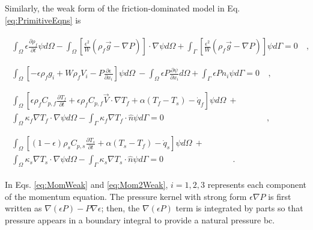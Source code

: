 \noindent Similarly, the weak form of the friction-dominated model in Eq. \eqref{eq:PrimitiveEqns} is

\begin{subequations}
\label{eq:PrimitiveWeakForms}
\begin{align}
\label{eq:Mass2Weak}
\begin{split}
\int_\Omega\epsilon\frac{\partial\rho_f}{\partial t}\psi d\Omega-\int_\Omega\left\lbrack\frac{\epsilon^2}{W}\left(\rho_f\vec{g}-\nabla P\right)\right\rbrack\cdot\nabla\psi d\Omega+\int_\Gamma\left\lbrack\frac{\epsilon^2}{W}\left(\rho_f\vec{g}-\nabla P\right)\right\rbrack \psi d\Gamma=0&\ ,\\
&
\end{split}\\
%
%
\label{eq:Mom2Weak}
\begin{split}\int_\Omega\left\lbrack-\epsilon\rho_f g_i+W\rho_fV_i-P\frac{\partial\epsilon}{\partial x_i}\right\rbrack\psi d\Omega\ -\int_\Omega \epsilon P\frac{\partial\psi}{\partial x_i}d\Omega+\int_\Gamma\epsilon Pn_i\psi d\Gamma=0&\ ,\\
&
\end{split}\\
%
%
\label{eq:Energy2Weak}
\begin{split}
\int_\Omega\left\lbrack\epsilon\rho_fC_{p,f}\frac{\partial T_f}{\partial t}+\epsilon\rho_fC_{p,f}\vec{V}\cdot\nabla T_f+\alpha(T_f-T_s)-\dot{q}_f\right\rbrack\psi d\Omega\ +\hspace{1cm}\\
\int_\Omega\kappa_f\nabla T_f\cdot\nabla \psi d\Omega-\int_\Gamma\kappa_f\nabla T_f\cdot\hat{n}\psi d\Gamma=0&\ ,\\
&
\end{split}\\
%
%
\label{eq:PrimitiveEnergyWeak}
\begin{split}\int_\Omega\left\lbrack(1-\epsilon)\rho_sC_{p,s}\frac{\partial T_s}{\partial t}+\alpha(T_s-T_f)-\dot{q}_s\right\rbrack\psi d\Omega\ +\hspace{1cm}\\
\int_\Omega\kappa_s\nabla T_s\cdot\nabla\psi d\Omega-\int_\Gamma\kappa_s\nabla T_s\cdot\hat{n}\psi d\Gamma=0&\ .\end{split}
\end{align}
\end{subequations}

\noindent In Eqs. \eqref{eq:MomWeak} and \eqref{eq:Mom2Weak}, \(i=1,2,3\) represents each component of the momentum equation. The pressure kernel with strong form \(\epsilon\nabla P\) is first written as \(\nabla(\epsilon P)-P\nabla\epsilon\); then, the \(\nabla(\epsilon P)\) term is integrated by parts so that pressure appears in a boundary integral to provide a natural pressure \gls{bc}. 


